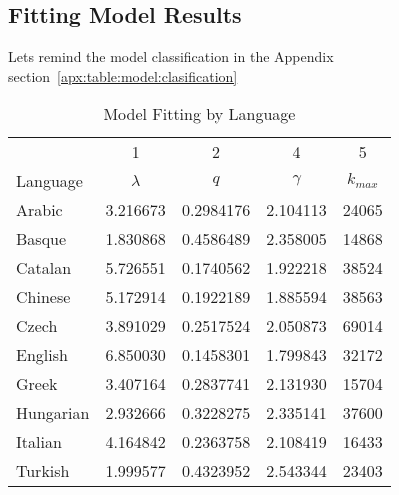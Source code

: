 \documentclass[12pt, a4paper]{article}
\begin{document}
\subsection{Fitting Model Results}
Lets remind the model classification in the Appendix section~\ref{apx:table:model:clasification}

\begin{table}[H]
\centering
    \begin{tabular}{l c c c c}
             & 1 & 2 & 4 & 5\\
    Language & $\lambda$ & $q$ & $\gamma$ & $k_{max}$\\
     \hline
     Arabic    & 3.216673 & 0.2984176 & 2.104113 & 24065 \\
     Basque    & 1.830868 & 0.4586489 & 2.358005 & 14868 \\
     Catalan   & 5.726551 & 0.1740562 & 1.922218 & 38524 \\
     Chinese   & 5.172914 & 0.1922189 & 1.885594 & 38563 \\
     Czech     & 3.891029 & 0.2517524 & 2.050873 & 69014 \\
     English   & 6.850030 & 0.1458301 & 1.799843 & 32172 \\
     Greek     & 3.407164 & 0.2837741 & 2.131930 & 15704 \\
     Hungarian & 2.932666 & 0.3228275 & 2.335141 & 37600 \\
     Italian   & 4.164842 & 0.2363758 & 2.108419 & 16433 \\
     Turkish   & 1.999577 & 0.4323952 & 2.543344 & 23403 
    \end{tabular}
   \caption{Model Fitting by Language}
   \label{table:3}
\end{table}
\end{document}
